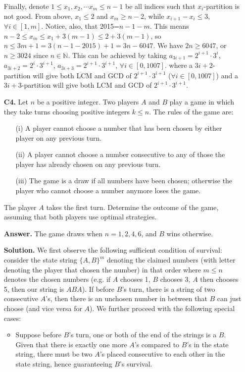 \documentclass[11pt,a4paper]{article}
\begin{document}
\begin{enumerate}
Finally, denote $1\le x_1, x_2,\cdots x_m\le n-1$ be all indices such that $x_i$-partition is not good. From above, $x_1\le 2$ and $x_m\ge n-2$, while $x_{i+1}-x_{i}\le 3$, $\forall i\in [1,m]$. Notice, also, that 2015=$n-1-m$. This means $n-2\le x_m\le x_1+3(m-1)\le 2+3(m-1)$, so $n\le 3m+1=3(n-1-2015)+1=3n-6047$. We have $2n\ge 6047$, or $n\ge 3024$ since $n\in\mathbb{N}$. This can be achieved by taking $a_{3i+1}=2^{i+1}\cdot 3^{i}$, $a_{3i+2}=2^{i}\cdot 3^{i+1}$, $a_{3i+3}=2^{i+1}\cdot 3^{i+1}$, $\forall i\in[0,1007]$. where a $3i+2$-partition will give both LCM and GCD of $2^{i+1}\cdot 3^{i+1}$ ($\forall i\in [0,1007]$) and a $3i+3$-partition will give both LCM and GCD of $2^{i+1}\cdot 3^{i+1}$.

\item[\textbf{C4.}] Let $n$ be a positive integer. Two players $A$ and $B$ play a game in which they take turns choosing positive integers $k \le n$. The rules of the game are:

\begin{enumerate}
	\item [(i)] A player cannot choose a number that has been chosen by either player on any previous turn.
	\item [(ii)] A player cannot choose a number consecutive to any of those the player has already chosen on any previous turn.
	\item [(iii)] The game is a draw if all numbers have been chosen; otherwise the player who cannot choose a number anymore loses the game.
\end{enumerate}


The player $A$ takes the first turn. Determine the outcome of the game, assuming that both players use optimal strategies.

\textbf{Answer.} The game draws when $n = 1, 2, 4, 6$, and $B$ wins otherwise. 

\textbf{Solution.} 
We first observe the following sufficient condition of survival: 
consider the state string $\{A, B\}^{m}$ denoting the claimed numbers (with letter denoting the player that chosen the number) in that order where $m\le n$ denotes the chosen numbers 
(e.g. if $A$ chooses 1, $B$ chooses 3, $A$ then chooses 5, then our string is $ABA$). 
If before $B$'s turn, there is a string of two consecutive $A$'s, then there is an unchosen number in between that $B$ can just choose (and vice versa for $A$). 
We further proceed with the following special cases: 
\begin{itemize}
	\item Suppose before $B$'s turn, one or both of the end of the strings is a $B$. 
	Given that there is exactly one more $A$'s compared to $B$'s in the state string, there must be two $A$'s placed consecutive to each other in the state string, hence guaranteeing $B$'s survival. 
	

\end{itemize}
\end{enumerate}
\end{document}
